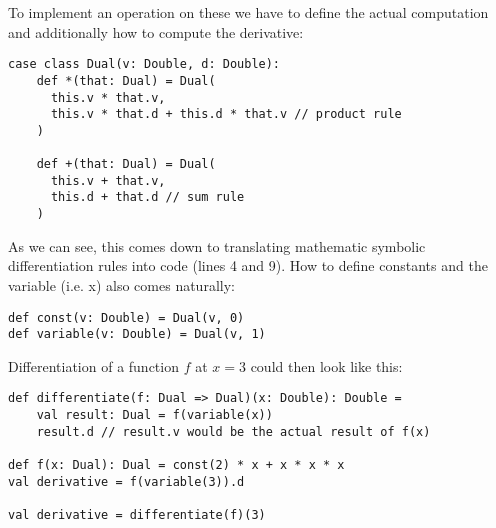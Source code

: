 To implement an operation on these we have to define the actual computation and additionally how to compute the derivative:
\begin{lstlisting}[caption={Dual number implementation}, label={lst:forwardDualNumber}]
case class Dual(v: Double, d: Double):
    def *(that: Dual) = Dual(
      this.v * that.v,
      this.v * that.d + this.d * that.v // product rule
    )
  
    def +(that: Dual) = Dual(
      this.v + that.v,
      this.d + that.d // sum rule
    )
\end{lstlisting}
As we can see, this comes down to translating mathematic symbolic differentiation rules into code (lines 4 and 9). How to define constants and the variable (i.e. x) also comes naturally:
\begin{lstlisting}
def const(v: Double) = Dual(v, 0)
def variable(v: Double) = Dual(v, 1)
\end{lstlisting}
Differentiation of a function $f$ at $x = 3$ could then look like this:
\begin{lstlisting}
def differentiate(f: Dual => Dual)(x: Double): Double =
    val result: Dual = f(variable(x))
    result.d // result.v would be the actual result of f(x)

def f(x: Dual): Dual = const(2) * x + x * x * x
val derivative = f(variable(3)).d

val derivative = differentiate(f)(3)  
\end{lstlisting}



